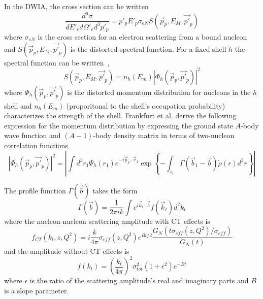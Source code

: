 
In the DWIA, the cross section can be written
\begin{equation}
    \frac{d^6\sigma}{dE'_{e} d\Omega'_{e} d^3p'_{p}} = p'_p E'_p \sigma_{eN} S(\vec{p}_p, E_M, \vec{p'}_p)
\end{equation}
where $\sigma_{eN}$ is the cross section for an electron scattering from a
bound nucleon and $S(\vec{p}_p, E_M, \vec{p'}_p)$ is the distorted
spectral function.
For a fixed shell $h$ the spectral function can be written~\cite{Frullani_1984},
\begin{equation}
    S(\vec{p}_p, E_M, \vec{p'}_p) = n_h(E_m) |\Phi_h(\vec{p}_p, \vec{p'}_p)|^2
\end{equation}
where $\Phi_h(\vec{p}_p, \vec{p'}_p)$ is the distorted momentum distribution for
nucleons in the $h$ shell
and
$n_h(E_m)$ (proporitonal to the shell's occupation probability) characterizes
the strength of the shell.
Frankfurt et al. derive the following expression for the momentum distribution
by expressing the ground state $A$-body wave function and $(A-1)$-body density
matrix in terms of two-nucleon correlation functions
\begin{equation}
    \left| \Phi_h(\vec{p}_p, \vec{p'}_p)\right|^2
        = \left|
            \int d^3 r_1 \Psi_h(r_1) e^{-i \vec{p}_p \cdot \vec{r}_1}
            \exp{\left\{- \int_{z_{1}} \Gamma\left(\vec{b}_1-\vec{b}\right) \tilde{\rho}(r) d^3 r\right\}}
          \right|
\end{equation}

The profile function $\Gamma(\vec{b})$ takes the form
\begin{equation}
    \Gamma(\vec{b}) = \frac{1}{2\pi i k}
                  \int e^{i\vec{k}_t \cdot \vec{b}} f(\vec{k}_t) d^2k_t
\end{equation}
where the nucleon-nucleon scattering amplitude with CT effects is
\begin{equation}
    f_{CT}(k_t, z, Q^2) = i\frac{k}{4\pi} \sigma_{eff}(z,Q^2) e^{Bt/2}
                          \frac{G_N\left( t \sigma_{eff}(z,Q^2)/\sigma_{eff} \right)}
                               {G_N\left( t \right)}
\end{equation}
and the amplitude without CT effects is
\begin{equation}
    f(k_t) = \left(\frac{k_t}{4\pi}\right)^2
             \sigma_{tot}^2
             (1+\epsilon^2) e^{-Bt}
\end{equation}
where
$\epsilon$ is the ratio of the scattering amplitude's real and imaginary parts
and
$B$ is a slope parameter.

